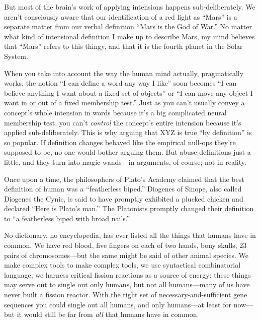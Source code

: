 {
 But most of the brain's work of applying
intensions happens sub-deliberately. We aren't
consciously aware that our identification of a red light as
``Mars'' is a separate matter from
our verbal definition ``Mars is the God of
War.'' No matter what kind of intensional definition
I make up to describe Mars, my mind believes that
``Mars'' refers to this thingy, and
that it is the fourth planet in the Solar System.}

{
 When you take into account the way the human mind actually,
pragmatically works, the notion ``I can define a word
any way I like'' soon becomes ``I
can believe anything I want about a fixed set of
objects'' or ``I can move any object
I want in or out of a fixed membership test.'' Just
as you can't usually convey a concept's
whole intension in words because it's a big complicated
neural membership test, you can't \textit{control} the
concept's entire intension because it's
applied sub-deliberately. This is why arguing that XYZ is true
``by definition'' is so popular. If
definition changes behaved like the empirical null-ops
they're supposed to be, no one would bother arguing
them. But abuse definitions just a little, and they turn into magic
wands---in arguments, of course; not in reality.}

\myendsectiontext


\bigskip


{
 Once upon a time, the philosophers of Plato's
Academy claimed that the best definition of human was a
``featherless biped.'' Diogenes of
Sinope, also called Diogenes the Cynic, is said to have promptly
exhibited a plucked chicken and declared ``Here is
Plato's man.'' The Platonists
promptly changed their definition to ``a featherless
biped with broad nails.'' }

{
 No dictionary, no encyclopedia, has ever listed all the things
that humans have in common. We have red blood, five fingers on each of
two hands, bony skulls, 23 pairs of chromosomes---but the same might be
said of other animal species. We make complex tools to make complex
tools, we use syntactical combinatorial language, we harness critical
fission reactions as a source of energy: these things may serve out to
single out only humans, but not all humans---many of us have never
built a fission reactor. With the right set of necessary-and-sufficient
gene sequences you could single out all humans, and only humans---at
least for now---but it would still be far from \textit{all} that humans
have in common.}

